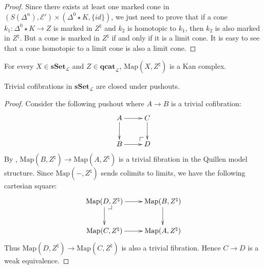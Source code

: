 \documentclass[reqno]{amsart}
\makeatletter
\theoremstyle{definition}
\theoremstyle{remark}
\newcommand{\cat}[1]{\mathbf{#1}}
\newcommand{\sSet}{\cat{sSet}}
\newcommand{\csSet}{\sSet_\mathcal{L}}
\newcommand{\cqCat}{\cat{qcat}_\mathcal{L}}
\newcommand{\join}{\star}
\newcommand{\Map}{\mathrm{Map}}
\numberwithin{figure}{section}
\newcommand{\pb}[1][dr]{\save*!/#1-1.2pc/#1:(-1,1)@^{|-}\restore}
\newcommand{\po}[1][dr]{\save*!/#1+1.2pc/#1:(1,-1)@^{|-}\restore}
\makeatother
\begin{document}
\begin{proof}
Since there exists at least one marked cone in $(S(\Delta^n),\mathcal{E}') \times (\Delta^0 \join K, \{ id \})$,
we just need to prove that if a cone $k_1 : \Delta^0 \join K \to Z$ is marked in $Z^\natural$ and $k_2$ is homotopic to $k_1$, then $k_2$ is also marked in $Z^\natural$.
But a cone is marked in $Z^\natural$ if and only if it is a limit cone.
It is easy to see that a cone homotopic to a limit cone is also a limit cone.
\end{proof}

\begin{cor}
For every $X \in \csSet$ and $Z \in \cqCat$, $\Map(X,Z^\natural)$ is a Kan complex.
\end{cor}

\begin{cor}
Trivial cofibrations in $\csSet$ are closed under pushouts.
\end{cor}
\begin{proof}
Consider the following pushout where $A \to B$ is a trivial cofibration:
\[ \xymatrix{ A \ar[r] \ar[d] & C \ar[d] \\
              B \ar[r]        & \po D
            } \]
By , $\Map(B,Z^\natural) \to \Map(A,Z^\natural)$ is a trivial fibration in the Quillen model structure.
Since $\Map(-,Z^\natural)$ sends colimits to limits, we have the following cartesian square:
\[ \xymatrix{ \Map(D,Z^\natural) \ar[r] \ar[d] \pb & \Map(B,Z^\natural) \ar[d] \\
              \Map(C,Z^\natural) \ar[r]            & \Map(A,Z^\natural)
            } \]
Thus $\Map(D,Z^\natural) \to \Map(C,Z^\natural)$ is also a trivial fibration.
Hence $C \to D$ is a weak equivalence.
\end{proof}
\end{document}
